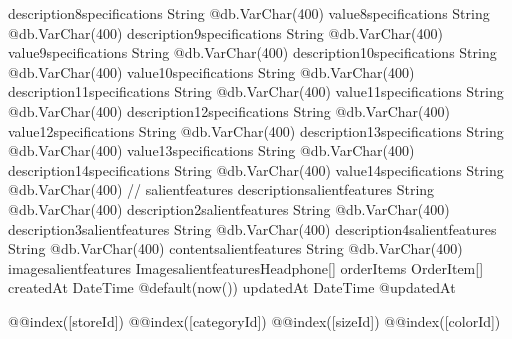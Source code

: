 {  description8specifications    String                          @db.VarChar(400)
  value8specifications          String                          @db.VarChar(400)
  description9specifications    String                          @db.VarChar(400)
  value9specifications          String                          @db.VarChar(400)
  description10specifications   String                          @db.VarChar(400)
  value10specifications         String                          @db.VarChar(400)
  description11specifications   String                          @db.VarChar(400)
  value11specifications         String                          @db.VarChar(400)
  description12specifications   String                          @db.VarChar(400)
  value12specifications         String                          @db.VarChar(400)
  description13specifications   String                          @db.VarChar(400)
  value13specifications         String                          @db.VarChar(400)
  description14specifications   String                          @db.VarChar(400)
  value14specifications         String                          @db.VarChar(400)
  // salientfeatures
  descriptionsalientfeatures    String                          @db.VarChar(400)
  description2salientfeatures   String                          @db.VarChar(400)
  description3salientfeatures   String                          @db.VarChar(400)
  description4salientfeatures   String                          @db.VarChar(400)
  contentsalientfeatures        String                          @db.VarChar(400)
  imagesalientfeatures ImagesalientfeaturesHeadphone[]
  orderItems                    OrderItem[]
  createdAt                     DateTime                        @default(now())
  updatedAt                     DateTime                        @updatedAt

  @@index([storeId])
  @@index([categoryId])
  @@index([sizeId])
  @@index([colorId])
}

